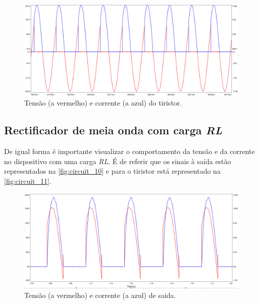 \documentclass[a4paper,11pt]{article}
\numberwithin{equation}{section}
\begin{document}
\begin{figure}[h]
	\centering
	\includegraphics[keepaspectratio=true, scale=0.3]{img/circuito7}
	\caption{Tensão (a vermelho) e corrente (a azul) do tiristor.}
	\label{fig:circuit_9}
	\vspace{-0.8em}
\end{figure}

\pagebreak
\subsection{Rectificador de meia onda com carga \textit{RL}}

De igual forma é importante visualizar o comportamento da tensão e da corrente no dispositivo com uma carga \textit{RL}. É de referir que os sinais à saída estão representados na \autoref{fig:circuit_10} e para o tiristor está representado na \autoref{fig:circuit_11}.

\begin{figure}[h]
	\centering
	\includegraphics[keepaspectratio=true, scale=0.35]{img/circuito8}
	\caption{Tensão (a vermelho) e corrente (a azul) de saida.}
	\label{fig:circuit_10}
	\vspace{-0.8em}
\end{figure}
\end{document}
